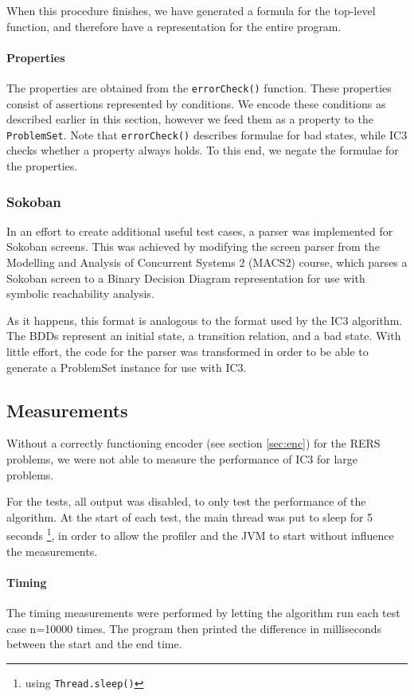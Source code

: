 \documentclass[a4paper]{article}
\begin{document}
When this procedure finishes, we have generated a formula for the top-level function, and therefore have a representation for the entire program.

\paragraph{Properties}
The properties are obtained from the \texttt{errorCheck()} function. These properties consist of assertions represented by conditions. We encode these conditions as described earlier in this section, however we feed them as a property to the \texttt{ProblemSet}. Note that \texttt{errorCheck()} describes formulae for bad states, while IC3 checks whether a property always holds. To this end, we negate the formulae for the properties.

\subsubsection{Sokoban}
In an effort to create additional useful test cases, a parser was implemented for Sokoban screens. 
This was achieved by modifying the screen parser from the Modelling and Analysis of Concurrent Systems 2 (MACS2) course, which parses a Sokoban screen to a Binary Decision Diagram representation for use with symbolic reachability analysis.

As it happens, this format is analogous to the format used by the IC3 algorithm. The BDDs represent an initial state, a transition relation, and a bad state.
With little effort, the code for the parser was transformed in order to be able to generate a ProblemSet instance for use with IC3.

\subsection{Measurements}
Without a correctly functioning encoder (see section \ref{sec:enc}) for the RERS problems, we were not able to measure the performance of IC3 for large problems.

For the tests, all output was disabled, to only test the performance of the algorithm. At the start of each test, the main thread was put to sleep for 5 seconds \footnote{using \texttt{Thread.sleep()}}, in order to allow the profiler and the JVM to start without influence the measurements.

\paragraph{Timing}
The timing measurements were performed by letting the algorithm run each test case n=10000 times. The program then printed the difference in milliseconds between the start and the end time.
\end{document}
